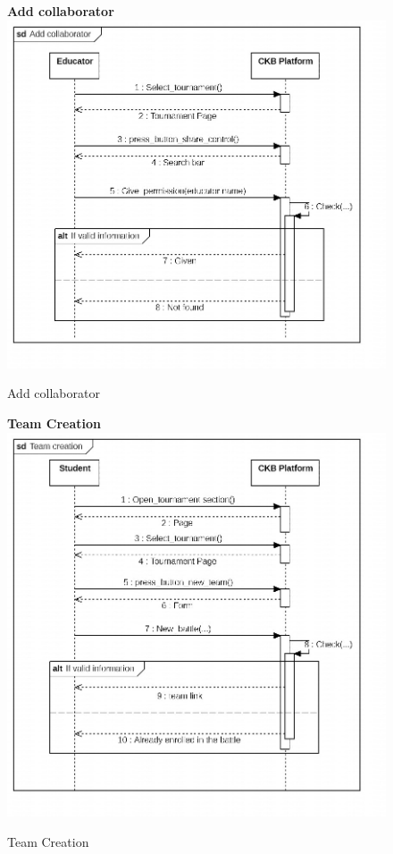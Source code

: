 \begin{enumerate}[label=\textbf{[UC\arabic*]}]
\begin{enumerate}[label=\textbf{[UC\arabic*]}]
    \begin{figure}
    \item \textbf{Add collaborator}
        \centering
        \includegraphics[width= \textwidth]{Images/Add collaborator.jpg}
        \caption{Add collaborator}
        \label{fig:enter-label}
    \end{figure}
    
    
    \begin{figure}
    \item \textbf{Team Creation}
        \centering
        \includegraphics[width= \textwidth]{Images/Team creation.jpg}
        \caption{Team Creation}
        \label{fig:enter-label}
    \end{figure}
    

\end{enumerate}
\end{enumerate}
